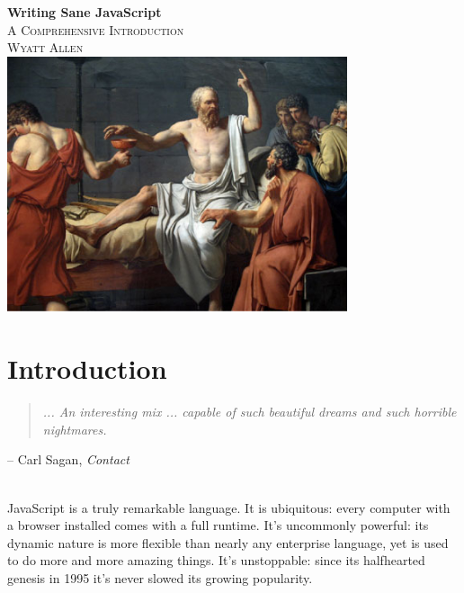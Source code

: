 \documentclass[11pt,letter]{book}
\begin{document}
    \frontmatter

    \begin{titlepage}
        \begin{center}
            { \huge \bfseries Writing Sane JavaScript}\\[0.4cm]
            \textsc{\Large A Comprehensive Introduction}\\[0.5cm]
            \textsc{Wyatt Allen}
            \HRule \\[1.2cm]
            \includegraphics[width=10cm]{socrates-hemlock}
            \vfill
        \end{center}
    \end{titlepage}
    
    \tableofcontents 
    
    \chapter*{Introduction}
    \begin{quote}
        \emph{
            ... An interesting mix ... capable of such beautiful dreams and such horrible 
            nightmares.
        }
    \end{quote}
    \begin{flushright}
        -- Carl Sagan, \emph{Contact}
    \end{flushright}
    \HRule \\[1.2cm]
    
    JavaScript is a truly remarkable language. It is ubiquitous: every computer with a browser 
    installed comes with a full runtime. It's uncommonly powerful: its dynamic nature is more 
    flexible than nearly any enterprise language, yet is used to do more and more amazing things.
    It's unstoppable: since its halfhearted genesis in 1995 it's never slowed its growing 
    popularity.
    
\end{document}
